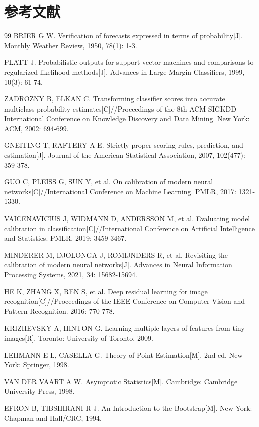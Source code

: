 {}
\section*{参考文献}

\begin{thebibliography}{99}
BRIER G W. Verification of forecasts expressed in terms of probability[J]. Monthly Weather Review, 1950, 78(1): 1-3.

PLATT J. Probabilistic outputs for support vector machines and comparisons to regularized likelihood methods[J]. Advances in Large Margin Classifiers, 1999, 10(3): 61-74.

ZADROZNY B, ELKAN C. Transforming classifier scores into accurate multiclass probability estimates[C]//Proceedings of the 8th ACM SIGKDD International Conference on Knowledge Discovery and Data Mining. New York: ACM, 2002: 694-699.

GNEITING T, RAFTERY A E. Strictly proper scoring rules, prediction, and estimation[J]. Journal of the American Statistical Association, 2007, 102(477): 359-378.

GUO C, PLEISS G, SUN Y, et al. On calibration of modern neural networks[C]//International Conference on Machine Learning. PMLR, 2017: 1321-1330.

VAICENAVICIUS J, WIDMANN D, ANDERSSON M, et al. Evaluating model calibration in classification[C]//International Conference on Artificial Intelligence and Statistics. PMLR, 2019: 3459-3467.

MINDERER M, DJOLONGA J, ROMIJNDERS R, et al. Revisiting the calibration of modern neural networks[J]. Advances in Neural Information Processing Systems, 2021, 34: 15682-15694.

HE K, ZHANG X, REN S, et al. Deep residual learning for image recognition[C]//Proceedings of the IEEE Conference on Computer Vision and Pattern Recognition. 2016: 770-778.

KRIZHEVSKY A, HINTON G. Learning multiple layers of features from tiny images[R]. Toronto: University of Toronto, 2009.

LEHMANN E L, CASELLA G. Theory of Point Estimation[M]. 2nd ed. New York: Springer, 1998.

VAN DER VAART A W. Asymptotic Statistics[M]. Cambridge: Cambridge University Press, 1998.

EFRON B, TIBSHIRANI R J. An Introduction to the Bootstrap[M]. New York: Chapman and Hall/CRC, 1994.
\end{thebibliography}
